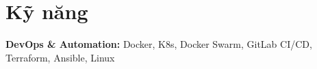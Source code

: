     









    

\section{Kỹ năng}

\begin{onecolentry}
    \textbf{DevOps \& Automation:} Docker, K8s, Docker Swarm, GitLab CI/CD, Terraform, Ansible, Linux
\end{onecolentry}
\vspace{0.2 cm}

